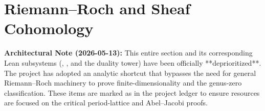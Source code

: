 \section{Riemann--Roch and Sheaf Cohomology}
\label{sec:riemann-roch}

\begin{layman}
\textbf{Architectural Note (2026-05-13):} This entire section and its
corresponding Lean subsystems (,
, and the  duality tower) have been
officially **deprioritized**. The project has adopted an analytic
shortcut that bypasses the need for general Riemann--Roch machinery
to prove finite-dimensionality and the genus-zero classification.
These items are marked as  in the project ledger to
ensure resources are focused on the critical period-lattice and
Abel--Jacobi proofs.
\end{layman}

